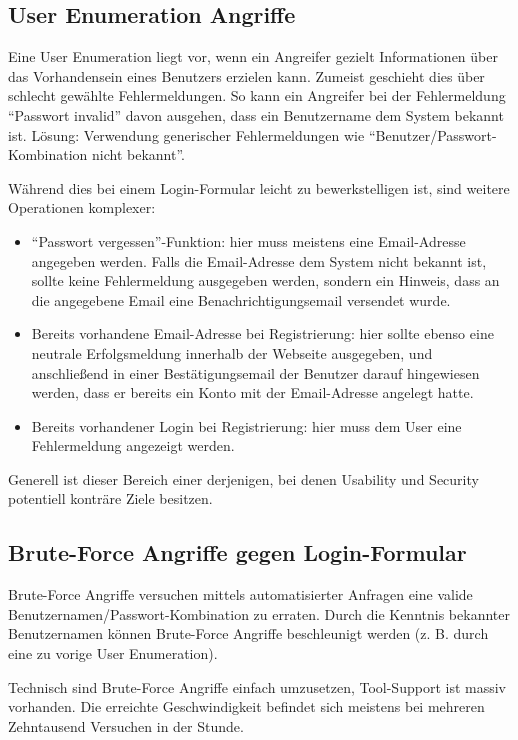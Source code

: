 \subsection{User Enumeration Angriffe}

Eine User Enumeration liegt vor, wenn ein Angreifer gezielt Informationen über das Vorhandensein eines Benutzers erzielen kann. Zumeist geschieht dies über schlecht gewählte Fehlermeldungen. So kann ein Angreifer bei der Fehlermeldung ``Passwort invalid'' davon ausgehen, dass ein Benutzername dem System bekannt ist. Lösung: Verwendung generischer Fehlermeldungen wie ``Benutzer/Passwort-Kombination nicht bekannt''.

Während dies bei einem Login-Formular leicht zu bewerkstelligen ist, sind weitere Operationen komplexer:

\begin{itemize}
	\item ``Passwort vergessen''-Funktion: hier muss meistens eine Email-Adresse angegeben werden. Falls die Email-Adresse dem System nicht bekannt ist, sollte keine Fehlermeldung ausgegeben werden, sondern ein Hinweis, dass an die angegebene Email eine Benachrichtigungsemail versendet wurde.
	\item Bereits vorhandene Email-Adresse bei Registrierung: hier sollte ebenso eine neutrale Erfolgsmeldung innerhalb der Webseite ausgegeben, und anschließend in einer Bestätigungsemail der Benutzer darauf hingewiesen werden, dass er bereits ein Konto mit der Email-Adresse angelegt hatte.
	\item Bereits vorhandener Login bei Registrierung: hier muss dem User eine Fehlermeldung angezeigt werden.
\end{itemize}

Generell ist dieser Bereich einer derjenigen, bei denen Usability und Security potentiell konträre Ziele besitzen.

\subsection{Brute-Force Angriffe gegen Login-Formular}

Brute-Force Angriffe versuchen mittels automatisierter Anfragen eine valide Benutzernamen/Passwort-Kombination zu erraten. Durch die Kenntnis bekannter Benutzernamen können Brute-Force Angriffe beschleunigt werden (z. B. durch eine zu vorige User Enumeration).

Technisch sind Brute-Force Angriffe einfach umzusetzen, Tool-Support ist massiv vorhanden. Die erreichte Geschwindigkeit befindet sich meistens bei mehreren Zehntausend Versuchen in der Stunde.

